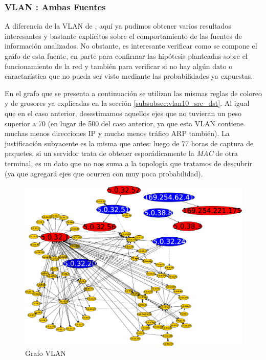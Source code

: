 \subsubsection*{\underline{VLAN : Ambas Fuentes}}\label{subsubsec:vlan20_src_dst}
\par A diferencia de la VLAN de , aqu\'i ya pudimos obtener varios
resultados interesantes y bastante expl\'icitos sobre el comportamiento de las fuentes
de informaci\'on analizados. No obstante, es interesante verificar como se compone
el gr\'afo de esta fuente, en parte para confirmar las hip\'otesis planteadas sobre
el funcionamiento de la red y tambi\'en para verificar si no hay alg\'un dato
o caractar\'istica que no pueda ser visto mediante las probabilidades ya expuestas.

\par En el grafo que se presenta a continuaci\'on se utilizan las mismas reglas de coloreo
y de grosores ya explicadas en la secci\'on \ref{subsubsec:vlan10_src_dst}. Al igual
que en el caso anterior, desestimamos aquellos ejes que no tuvieran un peso
superior a 70 (en lugar de 500 del caso anterior, ya que esta VLAN contiene muchas
menos direcciones IP y mucho menos tr\'afico ARP tambi\'en). La justificaci\'on subyacente
es la misma que antes: luego de 77 horas de captura de paquetes, si un servidor
trata de obtener espor\'adicamente la \textit{MAC} de otra terminal, es un dato
que no nos suma a la topolog\'ia que tratamos de descubrir (ya que agregar\'a ejes
que ocurren con muy poca probabilidad).

\begin{figure}[!t]
    \centering
    \includegraphics[width=\textwidth]{img/graph/escenario_1/vlan20/vlan20_70toEnd}
    \caption{Grafo VLAN }
    \label{fig:vlan20_grafo}
\end{figure}

